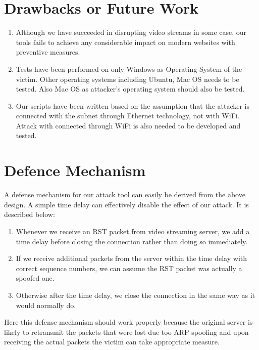 \documentclass[14pt]{extarticle}
\begin{document}
\section{Drawbacks or Future Work}
    \begin{enumerate}
        \item Although we have succeeded in disrupting video streams in some case, our tools fails to achieve any considerable impact on modern websites with preventive measures. 
        
        \item Tests have been performed on only Windows as Operating System of the victim. Other operating systems including Ubuntu, Mac OS needs to be tested. Also Mac OS as attacker's operating system should also be tested.
        
        \item Our scripts have been written based on the assumption that the attacker is connected with the subnet through Ethernet technology, not with WiFi. Attack with connected through WiFi is also needed to be developed and tested.
    
    \end{enumerate}
    


\section{Defence Mechanism}
    A defense mechanism for our attack tool can easily be derived from the above design. A simple time delay can effectively disable the effect of our attack. It is described below:
    
    \begin{enumerate}
        \item Whenever we receive an RST packet from video streaming server, we add a time delay before closing the connection rather than doing so immediately.
        \item If we receive additional packets from the server within the time delay with correct sequence numbers, we can assume the RST packet was actually a spoofed one.
        \item Otherwise after the time delay, we close the connection in the same way as it would normally do.
    \end{enumerate}
    
    Here this defense mechanism should work properly because the original server is likely to retransmit the packets that were lost due too ARP spoofing and upon receiving the actual packets the victim can take appropriate measure.
    
\end{document}
